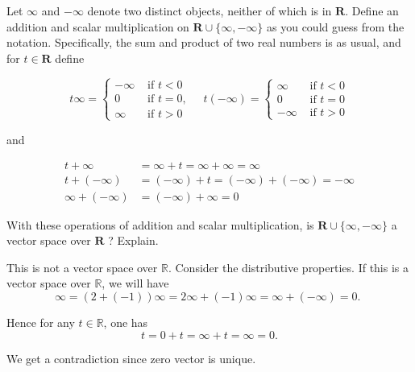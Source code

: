\begin{exercise}
Let $\infty$ and $-\infty$ denote two distinct objects, neither of which is in $\mathbf{R}$. Define an addition and scalar multiplication on $\mathbf{R} \cup\{\infty,-\infty\}$ as you could guess from the notation. Specifically, the sum and product of two real numbers is as usual, and for $t \in \mathbf{R}$ define

\[
t \infty=\left\{\begin{array}{ll}
-\infty & \text { if } t<0 \\
0 & \text { if } t=0, \\
\infty & \text { if } t>0
\end{array} \quad t(-\infty)= \begin{cases}\infty & \text { if } t<0 \\
0 & \text { if } t=0 \\
-\infty & \text { if } t>0\end{cases}\right.
\]

and

\[
\begin{aligned}
t+\infty & =\infty+t=\infty+\infty=\infty \\
t+(-\infty) & =(-\infty)+t=(-\infty)+(-\infty)=-\infty \\
\infty+(-\infty) & =(-\infty)+\infty=0
\end{aligned}
\]

With these operations of addition and scalar multiplication, is $\mathbf{R} \cup\{\infty,-\infty\}$ a vector space over $\mathbf{R}$ ? Explain.
\end{exercise}
\begin{solution}
This is not a vector space over $\mathbb{R}$. Consider the distributive properties. If this is a vector space over $\mathbb{R}$, we will have
$$
\infty=(2+(-1)) \infty=2 \infty+(-1) \infty=\infty+(-\infty)=0 \text {. }
$$

Hence for any $t \in \mathbb{R}$, one has
$$
t=0+t=\infty+t=\infty=0 .
$$

We get a contradiction since zero vector is unique.
\end{solution}

